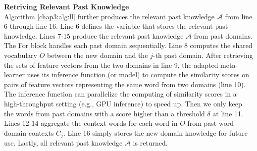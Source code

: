 \textbf{Retriving Relevant Past Knowledge}\\
Algorithm \ref{chap3:alg:ll} further produces the relevant past knowledge $\mathcal{A}$ from line 6 through line 16.
Line 6 defines the variable that stores the relevant past knowledge.
Lines 7-15 produce the relevant past knowledge $\mathcal{A}$ from past domains.
The For block handles each past domain sequentially.
Line 8 computes the shared vocabulary $O$ between the new domain and the $j$-th past domain.
After retrieving the sets of feature vectors from the two domains in line 9, the adapted meta-learner uses its inference function (or model) to compute the similarity scores on pairs of feature vectors representing the same word from two domains (line 10).
The inference function can parallelize the computing of similarity scores in a high-throughput setting (e.g., GPU inference) to speed up.
Then we only keep the words from past domains with a score higher than a threshold $\delta$ at line 11.
Lines 12-14 aggregate the context words for each word in $O$ from past word domain contexts $C_j$.
Line 16 simply stores the new domain knowledge for future use.
Lastly, all relevant past knowledge $\mathcal{A}$ is returned.

